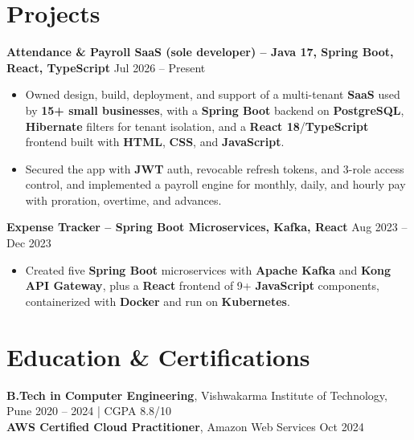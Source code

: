 \documentclass[a4paper,10pt]{article}
\begin{document}
\section*{Projects}

\textbf{Attendance \& Payroll SaaS (sole developer) -- Java 17, Spring Boot, React, TypeScript} \hfill Jul 2026 -- Present
\begin{itemize}[leftmargin=*]
    \item Owned design, build, deployment, and support of a multi-tenant \textbf{SaaS} used by \textbf{15+ small businesses}, with a \textbf{Spring Boot} backend on \textbf{PostgreSQL}, \textbf{Hibernate} filters for tenant isolation, and a \textbf{React 18}/\textbf{TypeScript} frontend built with \textbf{HTML}, \textbf{CSS}, and \textbf{JavaScript}.
    \item Secured the app with \textbf{JWT} auth, revocable refresh tokens, and 3-role access control, and implemented a payroll engine for monthly, daily, and hourly pay with proration, overtime, and advances.
\end{itemize}

\textbf{Expense Tracker -- Spring Boot Microservices, Kafka, React} \hfill Aug 2023 -- Dec 2023
\begin{itemize}[leftmargin=*]
    \item Created five \textbf{Spring Boot} microservices with \textbf{Apache Kafka} and \textbf{Kong API Gateway}, plus a \textbf{React} frontend of 9+ \textbf{JavaScript} components, containerized with \textbf{Docker} and run on \textbf{Kubernetes}.
\end{itemize}

\section*{Education \& Certifications}
\textbf{B.Tech in Computer Engineering}, Vishwakarma Institute of Technology, Pune \hfill 2020 -- 2024 \;|\; CGPA 8.8/10 \\
\textbf{AWS Certified Cloud Practitioner}, Amazon Web Services \hfill Oct 2024
\end{document}
